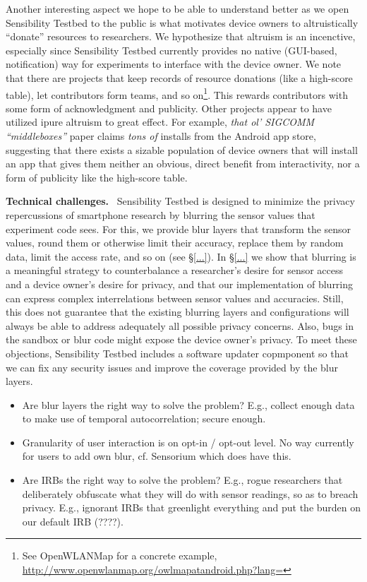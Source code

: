 Another interesting aspect we hope to be able to understand better as 
we open Sensibility Testbed to the public is what motivates device 
owners to altruistically ``donate'' resources to researchers. 
We hypothesize that altruism is an incenctive, especially since 
Sensibility Testbed currently provides no native (GUI-based, 
notification) way for experiments to interface with the device 
owner. We note that there are projects that keep records of 
resource donations (like a high-score table), let contributors form 
teams, and so on\footnote{See OpenWLANMap for a concrete example, \url{http://www.openwlanmap.org/owlmapatandroid.php?lang=}}.
This rewards contributors with some form of acknowledgment and 
publicity.
Other projects appear to have utilized ipure altruism to great effect.
For example, \textit{that ol' SIGCOMM ``middleboxes''} paper 
\cite{it} claims \textit{tons of} installs from the Android app 
store, suggesting that there exists a sizable population of device 
owners that will install an app that gives them neither an obvious, 
direct benefit from interactivity, nor a form of publicity like 
the high-score table.


\textbf{Technical challenges.}~
Sensibility Testbed is designed to minimize the privacy repercussions 
of smartphone research by blurring the sensor values that experiment 
code sees. For this, we provide blur layers that transform the sensor 
values, round them or otherwise limit their accuracy, replace them by 
random data, limit the access rate, and so on (see \S\ref{...}). 
In \S\ref{...} we show that blurring is a meaningful strategy to 
counterbalance a researcher's desire for sensor access and a device 
owner's desire for privacy, and that our implementation of blurring 
can express complex interrelations between sensor values and accuracies. 
Still, this does not guarantee that the existing blurring layers and 
configurations will always be able to address adequately all possible 
privacy concerns. Also, bugs in the sandbox or blur code might 
expose the device owner's privacy.  
To meet these objections, Sensibility Testbed includes a software 
updater copmponent so that we can fix any security issues and 
improve the coverage provided by the blur layers.


\begin{itemize}
  \item Are blur layers the right way to solve the problem? E.g., 
collect enough data to make use of temporal autocorrelation; secure enough.
  \item Granularity of user interaction is on opt-in / opt-out 
level. No way currently for users to add own blur, cf. Sensorium 
which does have this.
  \item Are IRBs the right way to solve the problem? E.g., 
rogue researchers that deliberately obfuscate what they will 
do with sensor readings, so as to breach privacy. E.g., 
ignorant IRBs that greenlight everything and put the burden on 
our default IRB (????).
\end{itemize}
